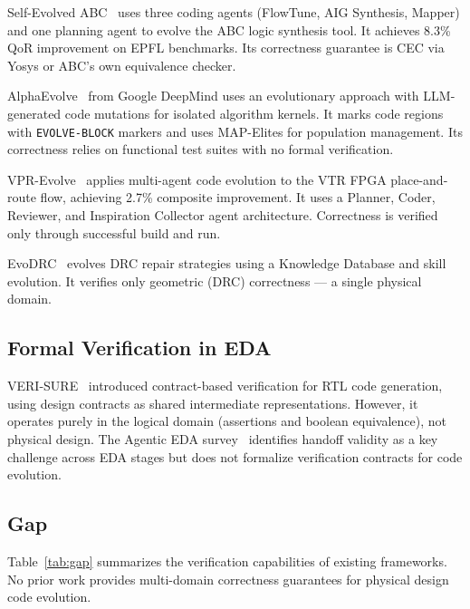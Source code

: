 \documentclass[conference]{IEEEtran}
\begin{document}
Self-Evolved ABC~\cite{self-evolved-abc} uses three coding agents (FlowTune, AIG Synthesis, Mapper) and one planning agent to evolve the ABC logic synthesis tool. It achieves 8.3\% QoR improvement on EPFL benchmarks. Its correctness guarantee is CEC via Yosys or ABC's own equivalence checker.

AlphaEvolve~\cite{alphaevolve} from Google DeepMind uses an evolutionary approach with LLM-generated code mutations for isolated algorithm kernels. It marks code regions with \texttt{EVOLVE-BLOCK} markers and uses MAP-Elites for population management. Its correctness relies on functional test suites with no formal verification.

VPR-Evolve~\cite{vpr-evolve} applies multi-agent code evolution to the VTR FPGA place-and-route flow, achieving 2.7\% composite improvement. It uses a Planner, Coder, Reviewer, and Inspiration Collector agent architecture. Correctness is verified only through successful build and run.

EvoDRC~\cite{evodrc} evolves DRC repair strategies using a Knowledge Database and skill evolution. It verifies only geometric (DRC) correctness --- a single physical domain.

\subsection{Formal Verification in EDA}

VERI-SURE~\cite{verisure} introduced contract-based verification for RTL code generation, using design contracts as shared intermediate representations. However, it operates purely in the logical domain (assertions and boolean equivalence), not physical design. The Agentic EDA survey~\cite{agentic-handoff} identifies handoff validity as a key challenge across EDA stages but does not formalize verification contracts for code evolution.

\subsection{Gap}

Table~\ref{tab:gap} summarizes the verification capabilities of existing frameworks. No prior work provides multi-domain correctness guarantees for physical design code evolution.
\end{document}
